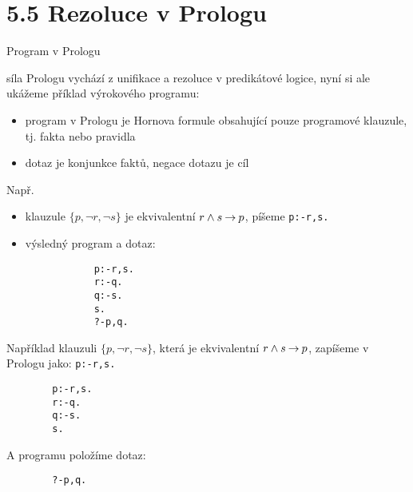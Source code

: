 \documentclass{beamer}
\begin{document}
\section{5.5 Rezoluce v Prologu}


\begin{frame}[fragile]{Program v Prologu}
    
    síla Prologu vychází z \alert{unifikace} a rezoluce v predikátové logice, nyní si ale ukážeme příklad \alert{výrokového} programu:

    \begin{itemize}
        \item \alert{program} v Prologu je Hornova formule obsahující pouze \alert{programové klauzule}, tj. \alert{fakta} nebo \alert{pravidla}
        \item \alert{dotaz} je konjunkce faktů, negace dotazu je \alert{cíl}
    \end{itemize}
    
    
        

    Např. 
    \begin{itemize}
        \item klauzule $\{p,\neg r,\neg s\}$ je ekvivalentní $r\land s\mathbin{\rightarrow} p$, píšeme \texttt{p:-r,s.}
        \item výsledný program a dotaz:
        \begin{verbatim}
            p:-r,s.
            r:-q.
            q:-s.
            s.
            ?-p,q.    
        \end{verbatim}
    \end{itemize}
    
    Například klauzuli $\{p,\neg r,\neg s\}$, která je ekvivalentní $r\land s\mathbin{\rightarrow} p$, zapíšeme v Prologu jako: \texttt{p:-r,s.}
    \begin{verbatim}
        p:-r,s.
        r:-q.
        q:-s.
        s.    
    \end{verbatim}
    A programu položíme dotaz:
    \begin{verbatim}
        ?-p,q.    
    \end{verbatim}

\end{frame}
\end{document}
